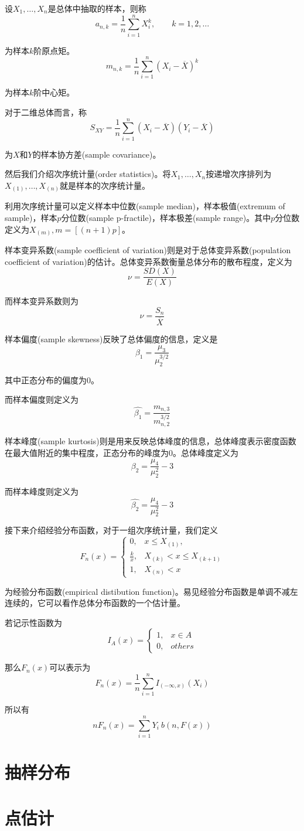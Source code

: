 \documentclass[UTF8]{ctexart}
\begin{document}
设$X_{1},\ldots ,X_{n}$是总体中抽取的样本，则称
$$a_{n,k}=\frac{1}{n}\sum_{i=1}^{n}X_{i}^{k},\qquad k=1,2,\ldots $$

为样本$k$阶原点矩。
$$m_{n,k}=\frac{1}{n}\sum_{i=1}^{n}(X_{i}-\overline{X})^{k} $$

为样本$k$阶中心矩。

对于二维总体而言，称
$$S_{XY}=\frac{1}{n}\sum_{i=1}^{n}(X_{i}-\overline{X})(Y_{i}-\overline{X}) $$

为$X$和$Y$的样本协方差(sample covariance)。

然后我们介绍次序统计量(order statistics)。将$X_{1},\ldots ,X_{n}$按递增次序排列为$X_{(1)},\ldots ,X_{(n)}$就是样本的次序统计量。

利用次序统计量可以定义样本中位数(sample median)，样本极值(extremum of sample)，样本$p$分位数(sample p-fractile)，样本极差(sample range)。其中$p$分位数定义为$X_{(m)},m=[(n+1)p]$。

样本变异系数(sample coefficient of variation)则是对于总体变异系数(population coefficient of variation)的估计。总体变异系数衡量总体分布的散布程度，定义为
$$\nu =\frac{SD(X)}{E(X)} $$

而样本变异系数则为
$$\nu = \frac{S_{n}}{\overline{X}} $$

样本偏度(sample skewness)反映了总体偏度的信息，定义是
$$\beta_{1}=\frac{\mu_{3}}{\mu_{2}^{3/2}} $$

其中正态分布的偏度为$0$。

而样本偏度则定义为
$$\hat{\beta_{1} }=\frac{m_{n,3}}{m_{n,2}^{3/2}} $$

样本峰度(sample kurtosis)则是用来反映总体峰度的信息，总体峰度表示密度函数在最大值附近的集中程度，正态分布的峰度为$0$。总体峰度定义为
$$\beta_{2}=\frac{\mu_{4}}{\mu_{2}^{2}}-3 $$

而样本峰度则定义为
$$\hat{\beta_{2}}=\frac{\mu_{4}}{\mu_{2}^{2}}-3 $$

接下来介绍经验分布函数，对于一组次序统计量，我们定义
$$F_{n}(x)=\left\{ \begin{array}{ll}
0, & x\leq X_{(1)},\\
\frac{k}{x}, & X_{(k)}<x\leq X_{(k+1)}\\
1, & X_{(n)}<x
\end{array} \right. $$

为经验分布函数(empirical distibution function)。易见经验分布函数是单调不减左连续的，它可以看作总体分布函数的一个估计量。

若记示性函数为
$$I_{A}(x)=\left\{ \begin{array}{ll}
1, & x\in A \\
0, & others
\end{array} \right. $$

那么$F_{n}(x)$可以表示为
$$F_{n}(x)=\frac{1}{n}\sum_{i=1}^{n}I_{(-\infty ,x)}(X_{i}) $$

所以有
$$nF_{n}(x)=\sum_{i=1}^{n}Y_{i}~b(n,F(x)) $$





\section{抽样分布}

\section{点估计}
\end{document}
